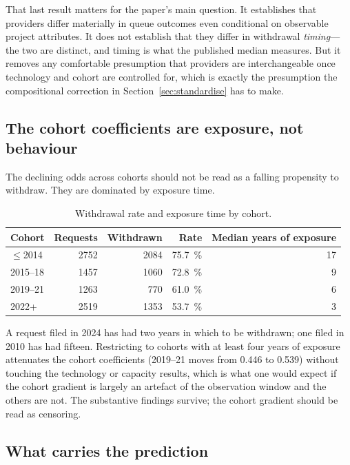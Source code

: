 \documentclass[11pt,a4paper]{article}
\begin{document}
That last result matters for the paper's main question. It establishes that
providers differ materially in queue outcomes even conditional on observable
project attributes. It does not establish that they differ in withdrawal
\emph{timing}---the two are distinct, and timing is what the published median
measures. But it removes any comfortable presumption that providers are
interchangeable once technology and cohort are controlled for, which is exactly
the presumption the compositional correction in Section~\ref{sec:standardise} has
to make.

\subsection{The cohort coefficients are exposure, not behaviour}

The declining odds across cohorts should not be read as a falling propensity to
withdraw. They are dominated by exposure time.

\begin{table}[htbp]
\centering
\caption{Withdrawal rate and exposure time by cohort.}
\begin{tabular}{lrrrr}
\toprule
Cohort & Requests & Withdrawn & Rate & Median years of exposure \\
\midrule
$\leq$2014 & \num{2752} & \num{2084} & \SI{75.7}{\percent} & 17 \\
2015--18   & \num{1457} & \num{1060} & \SI{72.8}{\percent} & 9 \\
2019--21   & \num{1263} & \num{770}  & \SI{61.0}{\percent} & 6 \\
2022+      & \num{2519} & \num{1353} & \SI{53.7}{\percent} & 3 \\
\bottomrule
\end{tabular}
\end{table}

A request filed in 2024 has had two years in which to be withdrawn; one filed in
2010 has had fifteen. Restricting to cohorts with at least four years of exposure
attenuates the cohort coefficients (2019--21 moves from 0.446 to 0.539) without
touching the technology or capacity results, which is what one would expect if
the cohort gradient is largely an artefact of the observation window and the
others are not. The substantive findings survive; the cohort gradient should be
read as censoring.

\subsection{What carries the prediction}
\end{document}
